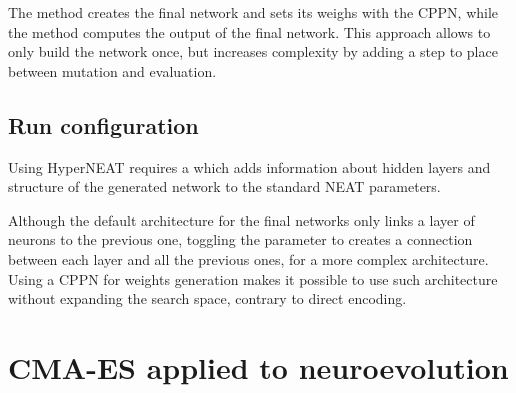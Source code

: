 The  method creates the final network and sets its weighs with the CPPN, while the  method computes the output of the final network. This approach allows to only build the network once, but increases complexity by adding a step to place between mutation and evaluation.

\subsection{Run configuration}

Using HyperNEAT requires a \href{https://github.com/TemplierPaul/NeuroEvolution.jl/blob/master/cfg/hyperneat.yaml}{\color{blue}{specific YAML file}} which adds information about hidden layers and structure of the generated network to the standard NEAT parameters. 

Although the default architecture for the final networks only links a layer of neurons to the previous one, toggling the  parameter to  creates a connection between each layer and all the previous ones, for a more complex architecture. Using a CPPN for weights generation makes it possible to use such architecture without expanding the search space, contrary to direct encoding. 

\section{CMA-ES applied to neuroevolution}

